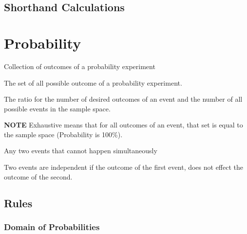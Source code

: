 \documentclass[11pt]{article}
\begin{document}


\subsection{Shorthand Calculations}


\section{Probability}

\begin{definition}[Event]\label{def:event}
    Collection of outcomes of a probability experiment
\end{definition}

\begin{definition}\label{def:sample-space}
    The set of all possible outcome of a probability experiment.
\end{definition}

\begin{definition}\label{def:Classical Probability}
    The ratio for the number of desired outcomes of an event
    and the number of all possible events in the sample space.
\end{definition}

\textbf{NOTE} Exhaustive means that for all outcomes of an event, that set is equal to the sample space (Probability is 100\%).

\begin{definition}\label{def:mutually-exclusive}
    Any two events that cannot happen simultaneously
\end{definition}

\begin{definition}\label{def:independent-events}
    Two events are independent if the outcome of the first event,
    does not effect the outcome of the second.
\end{definition}

\subsection{Rules}

\subsubsection{Domain of Probabilities}
\end{document}
